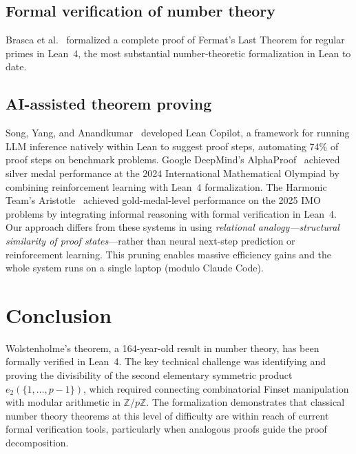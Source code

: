 \documentclass[11pt]{article}
\theoremstyle{definition}
\theoremstyle{remark}
\begin{document}
\subsection{Formal verification of number theory}

Brasca et al.~\cite{brasca2025} formalized a complete proof of Fermat's Last Theorem for regular primes in Lean~4, the most substantial number-theoretic formalization in Lean to date.

\subsection{AI-assisted theorem proving}

Song, Yang, and Anandkumar~\cite{song2024} developed Lean Copilot, a framework for running LLM inference natively within Lean to suggest proof steps, automating 74\% of proof steps on benchmark problems.
Google DeepMind's AlphaProof~\cite{alphaproof2025} achieved silver medal performance at the 2024 International Mathematical Olympiad by combining reinforcement learning with Lean~4 formalization.
The Harmonic Team's Aristotle~\cite{aristotle2025} achieved gold-medal-level performance on the 2025 IMO problems by integrating informal reasoning with formal verification in Lean~4.
Our approach differs from these systems in using \emph{relational analogy---structural similarity of proof states}---rather than neural next-step prediction or reinforcement learning. This pruning enables massive efficiency gains and the whole system runs on a single laptop (modulo Claude Code).

\section{Conclusion}

Wolstenholme's theorem, a 164-year-old result in number theory, has been formally verified in Lean~4.
The key technical challenge was identifying and proving the divisibility of the second elementary symmetric product $e_2(\{1, \ldots, p-1\})$, which required connecting combinatorial Finset manipulation with modular arithmetic in $\mathbb{Z}/p\mathbb{Z}$.
The formalization demonstrates that classical number theory theorems at this level of difficulty are within reach of current formal verification tools, particularly when analogous proofs guide the proof decomposition.
\end{document}

